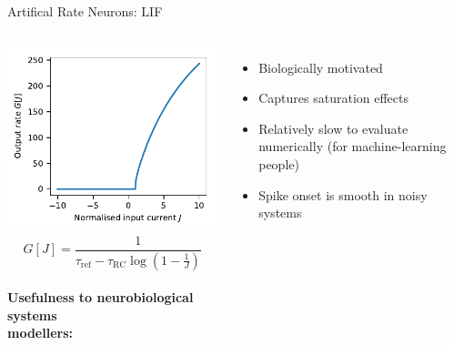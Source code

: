 \documentclass[handout,aspectratio=169]{beamer}
\begin{document}
\begin{frame}{Artifical Rate Neurons: LIF}
	\begin{columns}
		\includegraphics[width=\textwidth]{media/nonlinearity_lif.pdf}
		$$G[J] = \frac{1}{\tau_\mathrm{ref} - \tau_\mathrm{RC} \log\left( 1 - \frac{1}J \right)}$$\\[0.5cm]
		\textbf{Usefulness to neurobiological systems\\modellers:}
		\begin{itemize}
			\item[\OPlus] Biologically motivated
			\item[\OPlus] Captures saturation effects
			\item[\OMeh] Relatively slow to evaluate numerically (for machine-learning people)
			\item[\OMinus] Spike onset is smooth in noisy systems
		\end{itemize}
	\end{columns}	
\end{frame}
\end{document}
